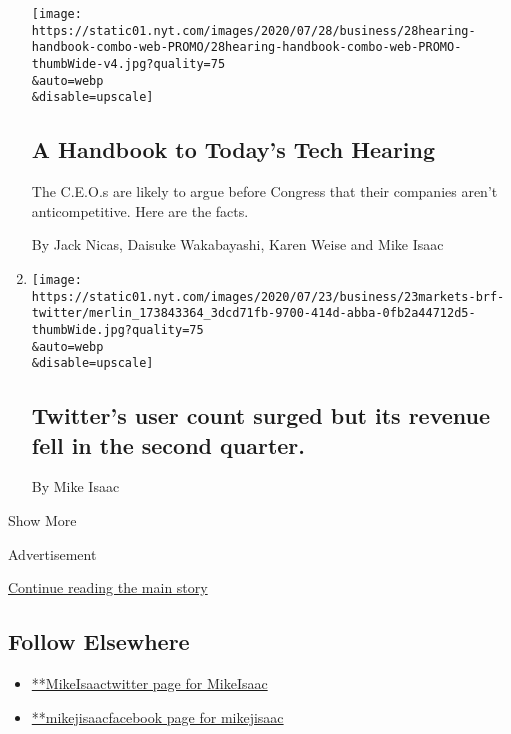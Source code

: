 \begin{enumerate}
  \texttt{[image: https://static01.nyt.com/images/2020/07/28/business/28hearing-handbook-combo-web-PROMO/28hearing-handbook-combo-web-PROMO-thumbWide-v4.jpg?quality=75\\\&auto=webp\\\&disable=upscale]}

  \hypertarget{a-handbook-to-todays-tech-hearing}{%
  \subsection{A Handbook to Today's Tech
  Hearing}\label{a-handbook-to-todays-tech-hearing}}

  The C.E.O.s are likely to argue before Congress that their companies
  aren't anticompetitive. Here are the facts.

  By Jack Nicas, Daisuke Wakabayashi, Karen Weise and Mike Isaac
\item
  \href{/2020/07/23/business/twitter-earnings.html}{}

  \texttt{[image: https://static01.nyt.com/images/2020/07/23/business/23markets-brf-twitter/merlin\_173843364\_3dcd71fb-9700-414d-abba-0fb2a44712d5-thumbWide.jpg?quality=75\\\&auto=webp\\\&disable=upscale]}

  \hypertarget{twitters-user-count-surged-but-its-revenue-fell-in-the-second-quarter}{%
  \subsection{Twitter's user count surged but its revenue fell in the
  second
  quarter.}\label{twitters-user-count-surged-but-its-revenue-fell-in-the-second-quarter}}

  By Mike Isaac
\end{enumerate}

Show More

Advertisement

\protect\hyperlink{after-mid2}{Continue reading the main story}

\hypertarget{follow-elsewhere}{%
\subsection{Follow Elsewhere}\label{follow-elsewhere}}

\begin{itemize}
\tightlist
\item
  \href{https://twitter.com/MikeIsaac}{**MikeIsaactwitter page for
  MikeIsaac}
\item
  \href{https://www.facebook.com/mikejisaac}{**mikejisaacfacebook page
  for mikejisaac}
\end{itemize}

